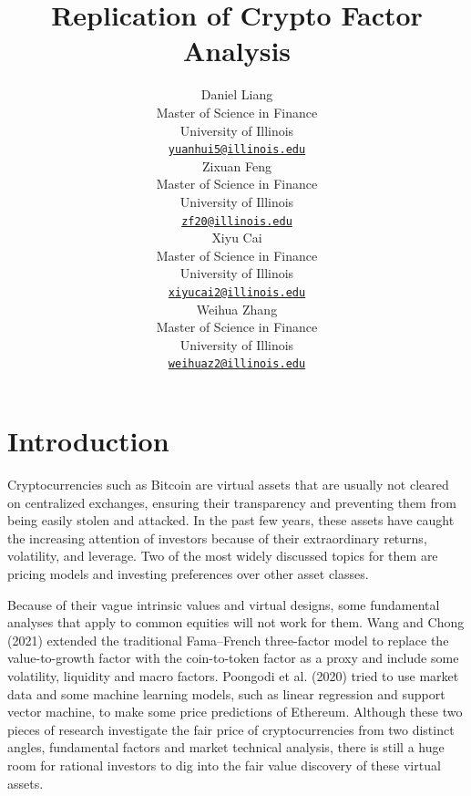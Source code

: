 \documentclass{article}
\title{Replication of Crypto Factor Analysis}
\author{
    \small
    \begin{minipage}[t]{0.24\textwidth}
        \centering
        Daniel Liang \\
        Master of Science in Finance \\
        University of Illinois \\
        \texttt{\href{mailto:yuanhui5@illinois.edu}{\nolinkurl{yuanhui5@illinois.edu}}}
    \end{minipage}
    \hfill
    \begin{minipage}[t]{0.24\textwidth}
        \centering
        Zixuan Feng \\
        Master of Science in Finance \\
        University of Illinois \\
        \texttt{\href{mailto:zf20@illinois.edu}{\nolinkurl{zf20@illinois.edu}}}
    \end{minipage}
    \hfill
    \begin{minipage}[t]{0.24\textwidth}
        \centering
        Xiyu Cai \\
        Master of Science in Finance \\
        University of Illinois \\
        \texttt{\href{mailto:xiyucai2@illinois.edu}{\nolinkurl{xiyucai2@illinois.edu}}}
    \end{minipage}
    \hfill
    \begin{minipage}[t]{0.24\textwidth}
        \centering
        Weihua Zhang \\
        Master of Science in Finance \\
        University of Illinois \\
        \texttt{\href{mailto:weihuaz2@illinois.edu}{\nolinkurl{weihuaz2@illinois.edu}}}
    \end{minipage}
}
\begin{document}
\maketitle


\begin{abstract}
\end{abstract}


\hypertarget{introduction}{%
\section{Introduction}\label{introduction}}

Cryptocurrencies such as Bitcoin are virtual assets that are usually not cleared on centralized exchanges, ensuring their transparency and preventing them from being easily stolen and attacked. In the past few years, these assets have caught the increasing attention of investors because of their extraordinary returns, volatility, and leverage. Two of the most widely discussed topics for them are pricing models and investing preferences over other asset classes. 

Because of their vague intrinsic values and virtual designs, some fundamental analyses that apply to common equities will not work for them. Wang and Chong (2021) extended the traditional Fama–French three-factor model to replace the value-to-growth factor with the coin-to-token factor as a proxy and include some volatility, liquidity and macro factors. Poongodi et al. (2020) tried to use market data and some machine learning models, such as linear regression and support vector machine, to make some price predictions of Ethereum. Although these two pieces of research investigate the fair price of cryptocurrencies from two distinct angles, fundamental factors and market technical analysis, there is still a huge room for rational investors to dig into the fair value discovery of these virtual assets.
\end{document}
